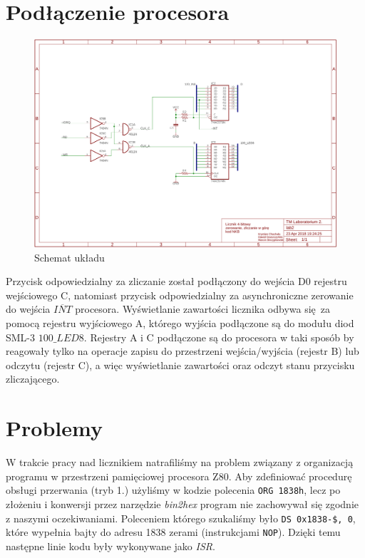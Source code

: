 \documentclass[fleqn]{article}
\begin{document}
\pagebreak

\section{Podłączenie procesora}

\begin{figure}[H]
	\centering
	\includegraphics[width=\textwidth]{img/schematic.pdf}
	\caption{Schemat układu}
	\label{fig:schematic}
\end{figure}

Przycisk odpowiedzialny za zliczanie został podłączony do wejścia D0 rejestru wejściowego C, natomiast przycisk odpowiedzialny za asynchroniczne zerowanie do wejścia $\overline{INT}$ procesora.
Wyświetlanie zawartości licznika odbywa się za pomocą rejestru wyjściowego A, którego wyjścia podłączone są do modułu diod SML-3 $\textit{100\_LED8}$. Rejestry A i C podłączone są do procesora w taki sposób by reagowały tylko na operacje zapisu do przestrzeni wejścia/wyjścia (rejestr B) lub odczytu (rejestr C), a więc wyświetlanie zawartości oraz odczyt stanu przycisku zliczającego.

\section{Problemy}
W trakcie pracy nad licznikiem natrafiliśmy na problem związany z organizacją programu w przestrzeni pamięciowej procesora Z80. Aby zdefiniować procedurę obsługi przerwania (tryb 1.) użyliśmy w kodzie polecenia \lstinline|ORG 1838h|, lecz po złożeniu i konwersji przez narzędzie \textit{bin2hex} program nie zachowywał się zgodnie z naszymi oczekiwaniami. Poleceniem którego szukaliśmy było \lstinline|DS 0x1838-$, 0|, które wypełnia bajty do adresu 1838 zerami (instrukcjami \lstinline|NOP|). Dzięki temu następne linie kodu były wykonywane jako \textit{ISR}.
\end{document}
